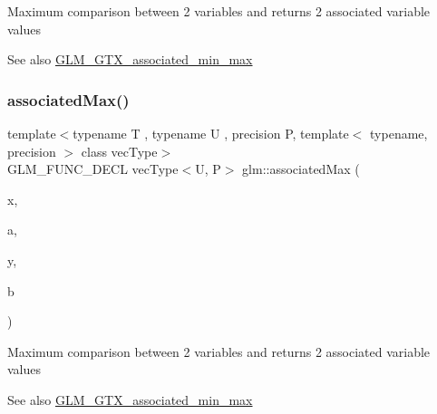 Maximum comparison between 2 variables and returns 2 associated variable values \begin{DoxySeeAlso}{See also}
\hyperlink{group__gtx__associated__min__max}{G\+L\+M\+\_\+\+G\+T\+X\+\_\+associated\+\_\+min\+\_\+max} 
\end{DoxySeeAlso}
\mbox{\label{group__gtx__associated__min__max_ga5364520173815b66a9d9e452c38bf312}} 
\subsubsection{\texorpdfstring{associated\+Max()}{associatedMax()}\hspace{0.1cm}{\footnotesize\ttfamily [4/12]}}
{\footnotesize\ttfamily template$<$typename T , typename U , precision P, template$<$ typename, precision $>$ class vec\+Type$>$ \\
G\+L\+M\+\_\+\+F\+U\+N\+C\+\_\+\+D\+E\+CL vec\+Type$<$U, P$>$ glm\+::associated\+Max (\begin{DoxyParamCaption}\item[{vec\+Type$<$ T, P $>$ const \&}]{x,  }\item[{U}]{a,  }\item[{vec\+Type$<$ T, P $>$ const \&}]{y,  }\item[{U}]{b }\end{DoxyParamCaption})}

Maximum comparison between 2 variables and returns 2 associated variable values \begin{DoxySeeAlso}{See also}
\hyperlink{group__gtx__associated__min__max}{G\+L\+M\+\_\+\+G\+T\+X\+\_\+associated\+\_\+min\+\_\+max} 
\end{DoxySeeAlso}
\mbox{\label{group__gtx__associated__min__max_gaec891e363d91abbf3a4443cf2f652209}} 

